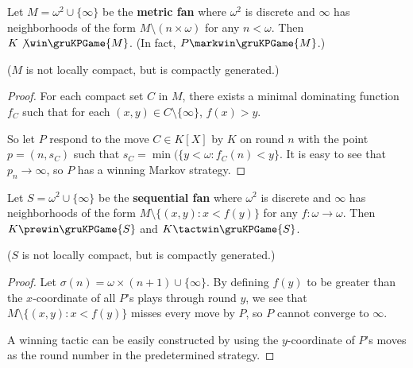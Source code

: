 \begin{ex}
Let $M = \omega^2 \cup \{\infty\}$ be the \textbf{metric fan} where $\omega^2$ is discrete and $\infty$ has neighborhoods of the form $M \setminus (n\times\omega)$ for any $n<\omega$. Then $K \not\win \gruKPGame{M}$. (In fact, $P \markwin \gruKPGame{M}$.)

($M$ is not locally compact, but is compactly generated.)
\end{ex}

\begin{proof}
For each compact set $C$ in $M$, there exists a minimal dominating function $f_C$ such that for each $(x,y)\in C\setminus\{\infty\}$, $f(x)> y$.

So let $P$ respond to the move $C\in K[X]$ by $K$ on round $n$ with the point $p=(n,s_C)$ such that $s_C = \min(\{y<\omega : f_C(n) < y\}$. It is easy to see that $p_n\rightarrow \infty$, so $P$ has a winning Markov strategy.
\end{proof}

\begin{ex}
Let $S = \omega^2 \cup \{\infty\}$ be the \textbf{sequential fan} where $\omega^2$ is discrete and $\infty$ has neighborhoods of the form $M \setminus \{(x,y) : x<f(y)\}$ for any $f:\omega\to\omega$. Then $K \prewin \gruKPGame{S}$ and $K\tactwin \gruKPGame{S}$.

($S$ is not locally compact, but is compactly generated.)


\end{ex}

\begin{proof}
Let $\sigma(n)=\omega\times(n+1) \cup \{\infty\}$. By defining $f(y)$ to be greater than the $x$-coordinate of all $P$'s plays through round $y$, we see that $M\setminus\{(x,y): x<f(y)\}$ misses every move by $P$, so $P$ cannot converge to $\infty$.

A winning tactic can be easily constructed by using the $y$-coordinate of $P$'s moves as the round number in the predetermined strategy.
\end{proof}
